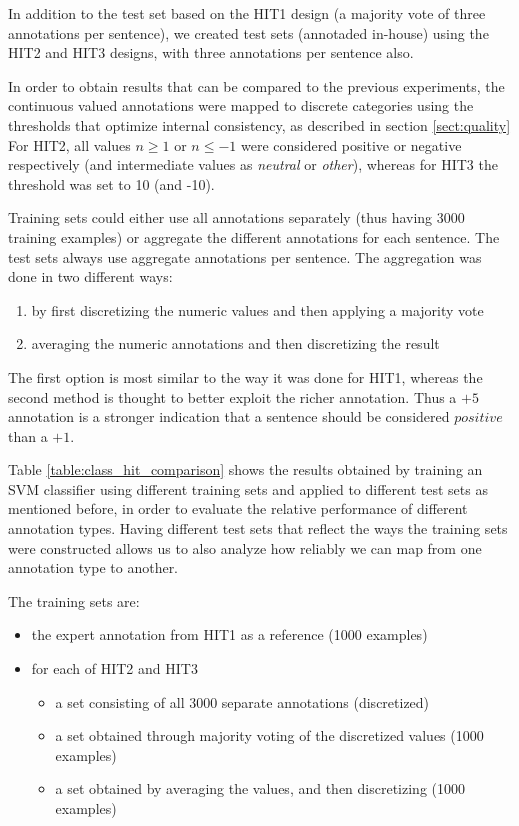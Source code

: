 \documentclass[11pt]{elsarticle}
\begin{document}
In addition to the test set based on the HIT1 design (a majority vote of three annotations per sentence), we created test sets (annotaded in-house) using the HIT2 and HIT3 designs, with three annotations per sentence also.

In order to obtain results that can be compared to the previous experiments, the continuous valued annotations were mapped to discrete categories using the thresholds that optimize internal consistency, as described in section \ref{sect:quality} For HIT2, all values $n \geq 1$ or $n \leq -1$ were considered positive or negative respectively (and intermediate values as \emph{neutral} or \emph{other}), whereas for HIT3 the threshold was set to 10 (and -10).

Training sets could either use all annotations separately (thus having 3000 training examples) or aggregate the different annotations for each sentence. The test sets always use aggregate annotations per sentence. The aggregation was done in two different ways:
\begin{enumerate}
 \item by first discretizing the numeric values and then applying a majority vote
 \item averaging the numeric annotations and then discretizing the result
\end{enumerate}

The first option is most similar to the way it was done for HIT1, whereas the second method is thought to better exploit the richer annotation. Thus a $+5$ annotation is a stronger indication that a sentence should be considered $positive$ than a $+1$.

Table \ref{table:class_hit_comparison} shows the results obtained by training an SVM classifier using different training sets and applied to different test sets as mentioned before, in order to evaluate the relative performance of different annotation types. Having different test sets that reflect the ways the training sets were constructed allows us to also analyze how reliably we can map from one annotation type to another.

The training sets are:
\begin{itemize}
 \item the expert annotation from HIT1 as a reference (1000 examples)
 \item for each of HIT2 and HIT3
 \begin{itemize}
  \item a set consisting of all 3000 separate annotations (discretized)
  \item a set obtained through majority voting of the discretized values (1000 examples)
  \item a set obtained by averaging the values, and then discretizing (1000 examples)
 \end{itemize}
\end{itemize}
\end{document}
